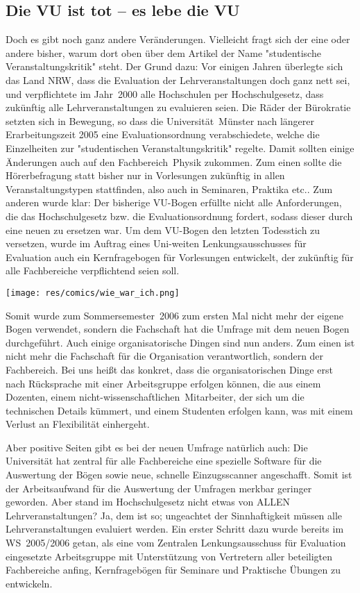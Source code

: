 \begin{multicols}{2}
\subsection*{Die VU ist tot -- es lebe die VU}
Doch es gibt noch ganz andere Veränderungen. Vielleicht fragt sich der eine oder andere bisher, warum dort oben über dem Artikel der Name "studentische Veranstaltungskritik" steht. Der Grund dazu: Vor einigen Jahren überlegte sich das Land NRW, dass die Evaluation der Lehrveranstaltungen doch ganz nett sei, und verpflichtete im Jahr~2000 alle Hochschulen per Hochschulgesetz, dass zukünftig alle Lehrveranstaltungen zu evaluieren seien. Die Räder der Bürokratie setzten sich in Bewegung, so dass die Universität~Münster nach längerer Erarbeitungszeit 2005 eine Evaluationsordnung verabschiedete, welche die Einzelheiten zur "studentischen Veranstaltungskritik" regelte. Damit sollten einige Änderungen auch auf den Fachbereich~Physik zukommen. Zum einen sollte die Hörerbefragung statt bisher nur in Vorlesungen zukünftig in allen Veranstaltungstypen stattfinden, also auch in Seminaren, Praktika etc.. Zum anderen wurde klar: Der bisherige VU-Bogen erfüllte nicht alle Anforderungen, die das Hochschulgesetz bzw. die Evaluationsordnung fordert, sodass dieser durch eine neuen zu ersetzen war. Um dem VU-Bogen den letzten Todesstich zu versetzen, wurde im Auftrag eines Uni-weiten Lenkungsausschusses für Evaluation auch ein Kernfragebogen für Vorlesungen entwickelt, der zukünftig für alle Fachbereiche verpflichtend seien soll.

\begin{center}
\texttt{[image: res/comics/wie\_war\_ich.png]}
\end{center}

Somit wurde zum Sommersemester~2006 zum ersten Mal nicht mehr der eigene Bogen verwendet, sondern die Fachschaft hat die Umfrage mit dem neuen Bogen durchgeführt. Auch einige organisatorische Dingen sind nun anders. Zum einen ist nicht mehr die Fachschaft für die Organisation verantwortlich, sondern der Fachbereich. Bei uns heißt das konkret, dass die organisatorischen Dinge erst nach Rücksprache mit einer Arbeitsgruppe erfolgen können, die aus einem Dozenten, einem nicht-wissenschaftlichen~Mitarbeiter, der sich um die technischen Details kümmert, und einem Studenten erfolgen kann, was mit einem Verlust an Flexibilität einhergeht.

Aber positive Seiten gibt es bei der neuen Umfrage natürlich auch: Die Universität hat zentral für alle Fachbereiche eine spezielle Software für die Auswertung der Bögen sowie neue, schnelle Einzugsscanner angeschafft. Somit ist der Arbeitsaufwand für die Auswertung der Umfragen merkbar geringer geworden. Aber stand im Hochschulgesetz nicht etwas von ALLEN Lehrveranstaltungen? Ja, dem ist so; ungeachtet der Sinnhaftigkeit müssen alle Lehrveranstaltungen evaluiert werden. Ein erster Schritt dazu wurde bereits im WS~2005/2006 getan, als eine vom Zentralen Lenkungsausschuss für Evaluation eingesetzte Arbeitsgruppe mit Unterstützung von Vertretern aller beteiligten Fachbereiche anfing, Kernfragebögen für Seminare und Praktische Übungen zu entwickeln.


\end{multicols}
